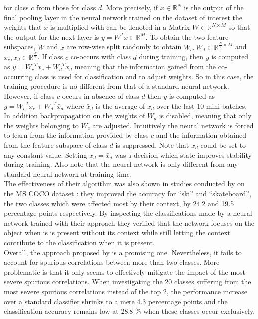 \documentclass{article}
\begin{document}
for class $c$ from those for class $d$. More precisely, if $x \in \mathbb{R}^N$ is the output of the final pooling layer
in the neural network trained on the dataset of interest the weights that $x$ is multiplied with can be denoted in a Matrix
$W \in \mathbb{R}^{N \times M}$ so that the output for the next layer is $y=W^Tx \in \mathbb{R}^M$. To obtain the two
feature subspaces, $W$ and $x$ are row-wise split randomly to obtain $W_c,W_d \in \mathbb{R}^{\frac{N}{2} \times M}$
and $x_c, x_d \in \mathbb{R}^{\frac{N}{2}}$. If class $c$ co-occurs with class $d$ during training, then $y$ is computed
as $y={W_c}^T x_c + {W_d}^T x_d$ meaning that the information gained from the co-occurring class is used for classification
and to adjust weights. So in this case, the training procedure is no different from that of a standard neural network.
However, if class $c$ occurs in absence of class $d$ then $y$ is computed as $y={W_c}^T x_c + {W_d}^T \bar{x}_d$ where
$\bar{x}_d$ is the average of $x_d$ over the last 10 mini-batches. In addition backpropagation on the weights of $W_d$
is disabled, meaning that only the weights belonging to $W_c$ are adjusted. Intuitively the neural network is forced to
learn from the information provided by class $c$ and the information obtained from the feature subspace of class $d$ is suppressed.
Note that $x_d$ could be set to any constant value. Setting $x_d = \bar{x}_d$ was a decision which \cite{Singh_2020_CVPR} state improves
stability during training. Also note that the neural network is only different from any standard neural network at training time. \\
The effectiveness of their algorithm was also shown in studies conducted by \cite{Singh_2020_CVPR} on the MS COCO dataset \cite{lin2015microsoft}:
they improved the accuracy for \enquote{ski} and \enquote{skateboard}, the two classes which were affected most by their context,
by 24.2 and 19.5 percentage points respectively. By inspecting the classifications made by a neural network trained with their
approach they verified that the network focuses on the object when is is present without its context while still letting the context contribute to the classification when it is present. \\
Overall, the approach proposed by \cite{Singh_2020_CVPR} is a promising one. Nevertheless, it fails to account for spurious correlations between
more than two classes. More problematic is that it only seems to effectively mitigate the impact of the most severe spurious correlations.
When investigating the 20 classes suffering from the most severe spurious correlations instead of the top 2, the performance increase
over a standard classifier shrinks to a mere 4.3 percentage points and the classification accuracy remains low at 28.8 \% when these
classes occur exclusively.
\end{document}
